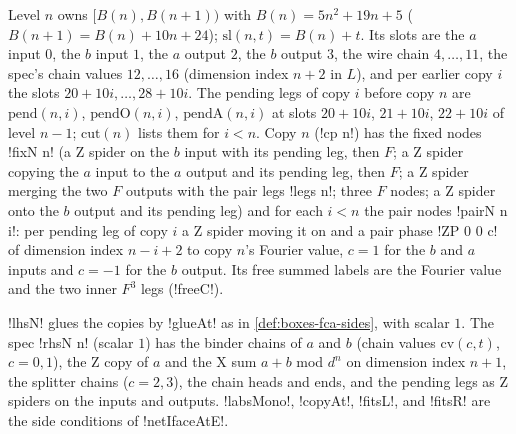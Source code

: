 {\begin{definition}\label{def:boxes-draper-cp}
Level $n$ owns $[B(n),B(n+1))$ with $B(n)=5n^2+19n+5$ ($B(n+1)=B(n)+10n+24$); $\mathrm{sl}(n,t)=B(n)+t$. Its slots are the $a$ input $0$, the $b$ input $1$, the $a$ output $2$, the $b$ output $3$, the wire chain $4,\ldots,11$, the spec's chain values $12,\ldots,16$ (dimension index $n+2$ in $L$), and per earlier copy $i$ the slots $20+10i,\ldots,28+10i$. The pending legs of copy $i$ before copy $n$ are $\mathrm{pend}(n,i)$, $\mathrm{pendO}(n,i)$, $\mathrm{pendA}(n,i)$ at slots $20+10i$, $21+10i$, $22+10i$ of level $n-1$; $\mathrm{cut}(n)$ lists them for $i<n$. Copy $n$ (\lbx!cp n!) has the fixed nodes \lbx!fixN n! (a Z spider on the $b$ input with its pending leg, then $F$; a Z spider copying the $a$ input to the $a$ output and its pending leg, then $F$; a Z spider merging the two $F$ outputs with the pair legs \lbx!legs n!; three $F$ nodes; a Z spider onto the $b$ output and its pending leg) and for each $i<n$ the pair nodes \lbx!pairN n i!: per pending leg of copy $i$ a Z spider moving it on and a pair phase \lbx!ZP 0 0 c! of dimension index $n-i+2$ to copy $n$'s Fourier value, $c=1$ for the $b$ and $a$ inputs and $c=-1$ for the $b$ output. Its free summed labels are the Fourier value and the two inner $F^3$ legs (\lbx!freeC!).
\end{definition}

\begin{definition}\label{def:boxes-draper-sides}
\lbx!lhsN! glues the copies by \lbx!glueAt! as in \cref{def:boxes-fca-sides}, with scalar $1$. The spec \lbx!rhsN n! (scalar $1$) has the binder chains of $a$ and $b$ (chain values $\mathrm{cv}(c,t)$, $c=0,1$), the Z copy of $a$ and the X sum $a+b$ mod $d^n$ on dimension index $n+1$, the splitter chains ($c=2,3$), the chain heads and ends, and the pending legs as Z spiders on the inputs and outputs. \lbx!labsMono!, \lbx!copyAt!, \lbx!fitsL!, and \lbx!fitsR! are the side conditions of \lbx!netIfaceAtE!.
\end{definition}

}
